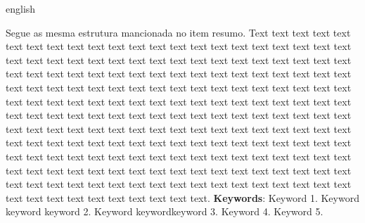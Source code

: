 \documentclass[
	12pt,				%
	openright,			%
	twoside,			%
	a4paper,			%
	chapter=TITLE,		%
	sumario=abnt-6027-2012,
	english,			%
	brazil				%
	]{UFVJM-abntex2}
\begin{document}
\begin{resumo}[ABSTRACT]
 \begin{otherlanguage*}{english}
   \noindent 

   \vspace{\onelineskip}

   \noindent Segue as mesma estrutura mancionada no item resumo. Text text text text text text text text text text text text text text text text text text text text text text text text text text text text text text text text text text text text text text text text text text text text text text text text text text text text text text text text text text text text text text text text text text text text text text text text text text text text text text text text text text text text text text text text text text text text text text text text text text text text text text text text text text text text text text text text text text text text text text text text text text text text text text text text text text text text text text text text text text text text text text text text text text text text text text text text text text text text text text text text text text text text text text text text text text text text text text text text text text text text text text text text text text text text text text text text text text text text text text text text text text.
\vspace{\onelineskip}
 \noindent   \textbf{Keywords}: Keyword 1. Keyword keyword keyword 2. Keyword keywordkeyword 3. Keyword 4. Keyword 5. 
 \end{otherlanguage*}
\end{resumo}
\vfill

% 

%  

\listoffigures*
\cleardoublepage
\end{document}
